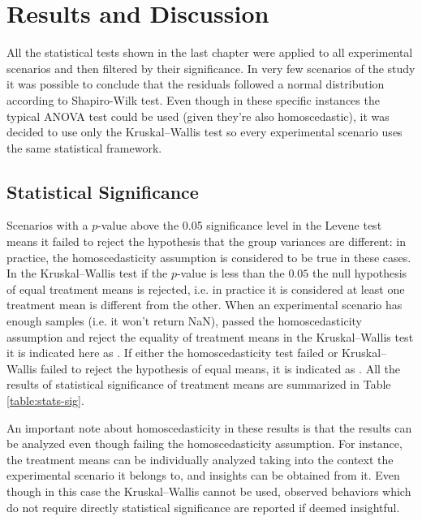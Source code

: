 \chapter{Results and Discussion}
\label{cap:results}

All the statistical tests shown in the last chapter were applied to all experimental scenarios and then filtered by their significance. In very few scenarios of the study it was possible to conclude that the residuals followed a normal distribution according to Shapiro-Wilk test. Even though in these specific instances the typical ANOVA test could be used (given they're also homoscedastic), it was decided to use only the Kruskal–Wallis test so every experimental scenario uses the same statistical framework.

\section{Statistical Significance}
\label{sec:stats-significance}

Scenarios with a $p$-value above the 0.05 significance level in the Levene test means it failed to reject the hypothesis that the group variances are different: in practice, the homoscedasticity assumption is considered to be true in these cases. In the Kruskal–Wallis test if the $p$-value is less than the $0.05$ the null hypothesis of equal treatment means is rejected, i.e. in practice it is considered at least one treatment mean is different from the other. When an experimental scenario has enough samples (i.e. it won't return NaN), passed the homoscedasticity assumption and reject the equality of treatment means in the Kruskal–Wallis test it is indicated here as \ok. If either the homoscedasticity test failed or Kruskal–Wallis failed to reject the hypothesis of equal means, it is indicated as \notok. All the results of statistical significance of treatment means are summarized in Table \ref{table:stats-sig}.

An important note about homoscedasticity in these results is that the results can be analyzed even though failing the homoscedasticity assumption. For instance, the treatment means can be individually analyzed taking into the context the experimental scenario it belongs to, and insights can be obtained from it. Even though in this case the Kruskal–Wallis cannot be used, observed behaviors which do not require directly statistical significance are reported if deemed insightful.

